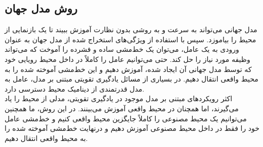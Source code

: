 \subsection{روش مدل جهان}
مدل جهانی
 می‌تواند به سرعت و به روشی بدون نظارت آموزش ببیند تا یک بازنمایی از محیط را بیاموزد. سپس با استفاده از ویژگی‌های استخراج شده از مدل جهان به عنوان ورودی به یک عامل، می‌توان یک خط‌مشی ساده و فشرده را آموخت که می‌تواند وظیفه مورد نیاز را حل کند. حتی می‌توانیم عامل را کاملاً در داخل محیط رویایی خود که توسط مدل جهانی آن ایجاد شده، آموزش دهیم و این خط‌مشی آموخته شده را به محیط واقعی انتقال دهیم. در بسیاری از مسائل یادگیری تقویتی مبتنی بر مدل، عامل به مدل قدرتمندی از دینامیک محیط دسترسی دارد.
 \\اکثر رویکردهای مبتنی بر مدل موجود در یادگیری تقویتی، مدلی از محیط را یاد می‌گیرند، اما همچنان در محیط واقعی آموزش می‌بینند. در این روش، ما همچنین می‌توانیم یک محیط  مصنوعی را کاملاً جایگزین محیط واقعی کنیم و خط‌مشی عامل خود را فقط در داخل محیط مصنوعی آموزش دهیم و درنهایت خط‌مشی آموخته شده را به محیط واقعی انتقال دهیم.

